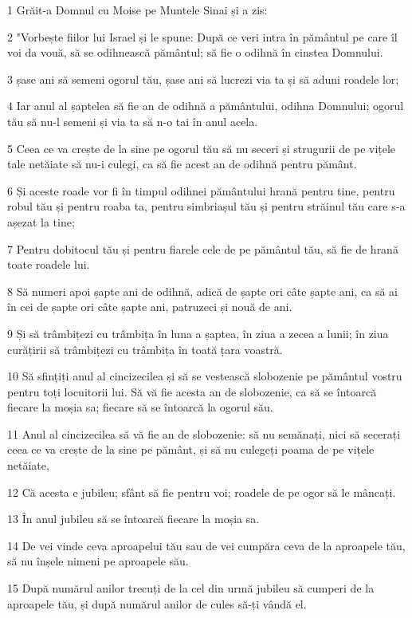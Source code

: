 \par 1 Grăit-a Domnul cu Moise pe Muntele Sinai și a zis:
\par 2 "Vorbește fiilor lui Israel și le spune: După ce veri intra în pământul pe care îl voi da vouă, să se odihnească pământul; să fie o odihnă în cinstea Domnului.
\par 3 șase ani să semeni ogorul tău, șase ani să lucrezi via ta și să aduni roadele lor;
\par 4 Iar anul al șaptelea să fie an de odihnă a pământului, odihna Domnului; ogorul tău să nu-l semeni și via ta să n-o tai în anul acela.
\par 5 Ceea ce va crește de la sine pe ogorul tău să nu seceri și strugurii de pe vițele tale netăiate să nu-i culegi, ca să fie acest an de odihnă pentru pământ.
\par 6 Și aceste roade vor fi în timpul odihnei pământului hrană pentru tine, pentru robul tău și pentru roaba ta, pentru simbriașul tău și pentru străinul tău care s-a așezat la tine;
\par 7 Pentru dobitocul tău și pentru fiarele cele de pe pământul tău, să fie de hrană toate roadele lui.
\par 8 Să numeri apoi șapte ani de odihnă, adică de șapte ori câte șapte ani, ca să ai în cei de șapte ori câte șapte ani, patruzeci și nouă de ani.
\par 9 Și să trâmbițezi cu trâmbița în luna a șaptea, în ziua a zecea a lunii; în ziua curățirii să trâmbițezi cu trâmbița în toată țara voastră.
\par 10 Să sfințiți anul al cincizecilea și să se vestească slobozenie pe pământul vostru pentru toți locuitorii lui. Să vă fie acesta an de slobozenie, ca să se întoarcă fiecare la moșia sa; fiecare să se întoarcă la ogorul său.
\par 11 Anul al cincizecilea să vă fie an de slobozenie: să nu semănați, nici să secerați ceea ce va crește de la sine pe pământ, și să nu culegeți poama de pe vițele netăiate,
\par 12 Că acesta e jubileu; sfânt să fie pentru voi; roadele de pe ogor să le mâncați.
\par 13 În anul jubileu să se întoarcă fiecare la moșia sa.
\par 14 De vei vinde ceva aproapelui tău sau de vei cumpăra ceva de la aproapele tău, să nu înșele nimeni pe aproapele său.
\par 15 După numărul anilor trecuți de la cel din urmă jubileu să cumperi de la aproapele tău, și după numărul anilor de cules să-ți vândă el.
